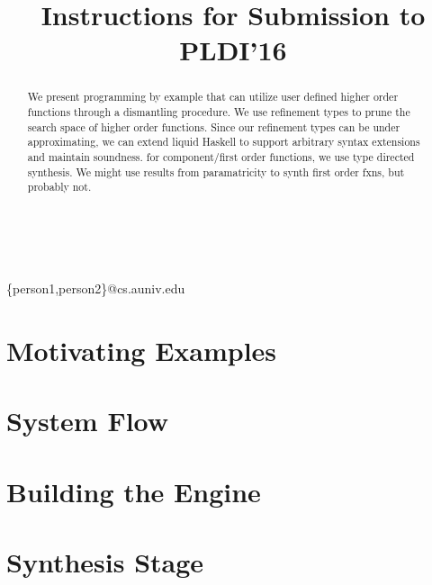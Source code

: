 \documentclass[pldi]{sigplanconf-pldi16}
\begin{document}
\title{Instructions for Submission to PLDI'16}

%
%

{ \\
  \\
}
{\{person1,person2\}@cs.auniv.edu}

\maketitle

\begin{abstract}
  We present programming by example that can utilize user defined higher order functions through a dismantling procedure.
  We use refinement types to prune the search space of higher order functions.
  Since our refinement types can be under approximating, we can extend liquid Haskell to support arbitrary syntax extensions and maintain soundness.
  for component/first order functions, we use type directed synthesis.
  We might use results from paramatricity to synth first order fxns, but probably not.
\end{abstract}


\section{Motivating Examples}


\section{System Flow}


\section{Building the Engine}


\section{Synthesis Stage}




\end{document}
